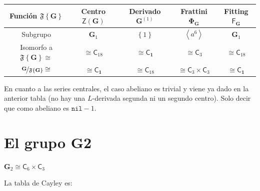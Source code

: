 \documentclass[final,12pt,a4paper,twoside,fleqn]{extbook}
\newcommand{\entreparentesis}[1]{\ensuremath{
        \left({#1}\right)
}}
\newcommand{\entreangulos}[1]{\ensuremath{\left\langle{#1}\right\rangle}}
\newcommand{\entrellaves}[1]{\ensuremath{\left\lbrace{#1}\right\rbrace}}
\newcommand{\set}[1]{\ensuremath{\left\lbrace{#1}\right\rbrace}}
\newcommand{\nil}[1]{\ensuremath{{\mathtt{nil}}-{#1}}}
\newcommand{\generadoporUitem}[1]{\ensuremath{
        \entreangulos{#1}
}}
\newcommand{\generadopor}[1]{\ensuremath{
        \generadoporUitem{#1}
}}
\newcommand{\grG}{\ensuremath{\mathbf{G}}}
\newcommand{\grcoc}[2]{\ensuremath{
        \nicefrac{#1}{#2}
}}
\newcommand{\grclass}[1]{\ensuremath{\mathsf{#1}}}
\newcommand{\cyclicgr}[1]{\ensuremath{{\grclass{C}}_{#1}}}
\newcommand{\trivialgr}{\ensuremath{{\grclass{C}}_{\mathbf{1}}}}
\newcommand{\pd}[2]{\ensuremath{{#1}\!          \times          \!{#2}}}
\newcommand{\pdcyclics}[2]{\ensuremath{\pd{\cyclicgr{#1}}{\cyclicgr{#2}}}}
\newcommand{\centro}[1]{\ensuremath{
        {\mathsf{Z}}
        {\left({#1}\right)}
}}
\newcommand{\frattini}[1]{\ensuremath{{\mathbf{\Phi }}_{#1}}}
\newcommand{\fitting}[1]{\ensuremath{{\bm{\mathsf{F}}}_{#1}}}
\newcommand{\grderivado}[2]{\ensuremath{
        {#1}^{\entreparentesis{#2}}
}}
\theoremstyle{definition}
\theoremstyle{remark}
\begin{document}
\begin{tabular}{|c|c|c|c|c|}
\hline
Funci\'on $\mathfrak{F}\entrellaves{\grG}$ & Centro $\centro{\grG}$ & Derivado $\grderivado{\grG}{1}$ & Frattini $\frattini{\grG}$& Fitting $\fitting{\grG}$\\
\hline
Subgrupo & $\grG_1$ & $\set{1}$ & $\generadopor{a^6}$ & $\grG_1$ \\
\hline
Isomorfo a $\mathfrak{F}\entrellaves{\grG}     \cong     $ & $     \cong     \cyclicgr{18}$ & $     \cong     \trivialgr$ & $     \cong     \cyclicgr{3}$ & $     \cong     \cyclicgr{18}$ \\
\hline
$\grcoc{\grG}{\mathfrak{F}\entrellaves{\grG}}     \cong     $ & $     \cong     \trivialgr$ & $     \cong     \cyclicgr{18}$ & $     \cong     \pdcyclics{3}{3}$ & $     \cong     \trivialgr$ \\
\hline
\end{tabular}

En cuanto a las series centrales, el caso abeliano es trivial y viene ya dado en la anterior tabla
(no hay una $L$-derivada segunda ni un segundo centro). Solo decir que como abeliano es $\nil{1}$.

\section{El grupo G2}



$\grG_2      \cong      \pdcyclics{6}{3}$


La tabla de Cayley es:
\end{document}
